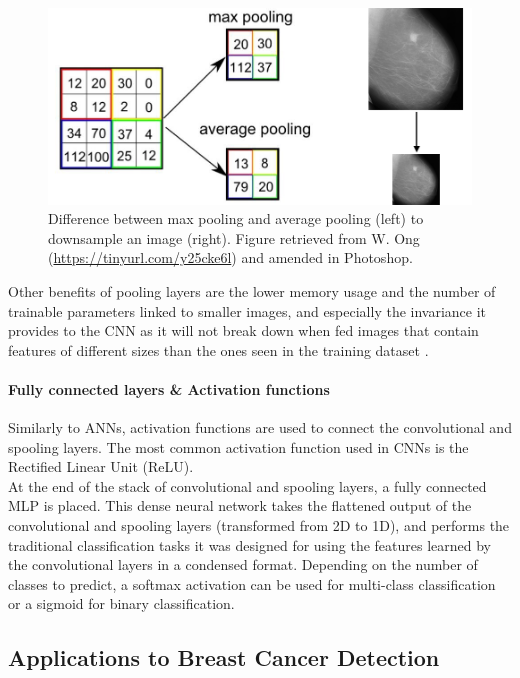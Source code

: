 \begin{figure}[ht]
\centerline{\includegraphics[width=\textwidth]{Dissertation/figures/litsurvey/max-vs-avg-pooling.png}}
\caption{\label{fig:litsurvey-max-vs-avg-pooling}Difference between max pooling and average pooling (left) to downsample an image (right). Figure retrieved from W. Ong (\url{https://tinyurl.com/y25cke6l}) and amended in Photoshop.}
\end{figure}

Other benefits of pooling layers are the lower memory usage and the number of trainable parameters linked to smaller images, and especially the invariance it provides to the CNN as it will not break down when fed images that contain features of different sizes than the ones seen in the training dataset \citep{Shen2017}.

\paragraph{Fully connected layers \& Activation functions}

Similarly to ANNs, activation functions are used to connect the convolutional and spooling layers. The most common activation function used in CNNs is the Rectified Linear Unit (ReLU).\\

At the end of the stack of convolutional and spooling layers, a fully connected MLP is placed. This dense neural network takes the flattened output of the convolutional and spooling layers (transformed from 2D to 1D), and performs the traditional classification tasks it was designed for using the features learned by the convolutional layers in a condensed  format. Depending on the number of classes to predict, a softmax activation can be used for multi-class classification or a sigmoid for binary classification.

\subsection{Applications to Breast Cancer Detection}

